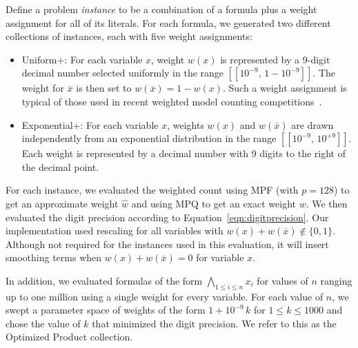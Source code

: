 \documentclass[letterpaper,USenglish,cleveref, autoref, thm-restate]{lipics-v2021}
\newcommand{\obar}[1]{\overline{#1}}
\newcommand{\approximate}[1]{\hat{#1}}
\newcommand{\approxw}{\approximate{w}}
\newcommand{\interval}[1]{[\![#1]\!]}
\begin{document}
Define a problem \emph{instance} to be a combination of a formula
plus a weight assignment for all of its literals.
For each formula, we generated two different collections of instances, each with five weight assignments:
\begin{itemize}
\item \textsf{Uniform$+$}: For each variable $x$, weight $w(x)$ is represented by a 9-digit decimal number selected uniformly in the range
  $\interval{10^{-9},\,1-10^{-9}}$. The weight for $\obar{x}$ is then set to
  $w(\obar{x}) = 1-w(x)$.  Such a weight assignment is typical of those used in recent weighted model counting competitions~\cite{fichte:jea:2020}.
\item \textsf{Exponential$+$}: For each variable $x$, weights $w(x)$ and $w(\obar{x})$
  are drawn independently from an exponential distribution in the range
  $\interval{10^{-9},\,10^{+9}}$.  Each weight is represented by a decimal number with 9 digits to the right of the decimal point.
\end{itemize}


For each instance, we evaluated
the weighted count using MPF (with $p=128$) to get an approximate weight $\approxw$ and
using MPQ to get an exact weight $w$.  We then evaluated the digit precision according to Equation~\ref{eqn:digitprecision}.   Our implementation used rescaling for all variables
with $w(x) + w(\obar{x}) \not \in \{0, 1\}$.
Although not required for the instances used in this evaluation,
it will insert smoothing terms when $w(x) + w(\obar{x}) = 0$ for variable $x$.

In addition, we evaluated formulas of the form $\bigwedge_{1\leq i
  \leq n} x_i$ for values of $n$ ranging up to one million using a
single weight for every variable.  For each value of $n$, we swept a parameter space of
weights of the form $1 + 10^{-9}\,k$ for $1 \leq k \leq 1000$ and
chose the value of $k$ that minimized the digit precision.  We refer
to this as the \textsf{Optimized Product} collection.
\end{document}
